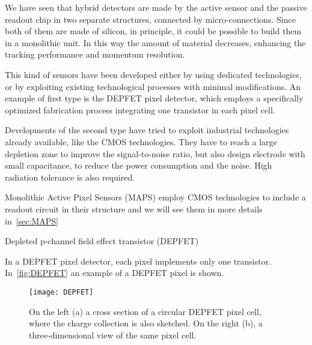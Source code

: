 We have seen that hybrid detectors are made by the active sensor and the passive readout chip in two separate structures, connected by micro-connections. Since both of them are made of silicon, in principle, it could be possible to build them in a monolithic unit. In this way the amount of material decreases, enhancing the tracking performance and momentum resolution. 

This kind of sensors have been developed either by using dedicated technologies, or by exploiting existing technological processes with minimal modifications. An example of first type is the DEPFET pixel detector, which employs a specifically optimized fabrication process integrating one transistor in each pixel cell.

Developments of the second type have tried to exploit industrial technologies already available, like the CMOS technologies. They have to reach a large depletion zone to improve the signal-to-noise ratio, but also design electrode with small capacitance, to reduce the power consumption and the noise. High radiation tolerance is also required.

Monolithic Active Pixel Sensors (MAPS) employ CMOS technologies to include a readout circuit in their structure and we will see them in more details in~\autoref{sec:MAPS}

\begin{description}
\item[Depleted p-channel field effect transistor (DEPFET)]
\end{description}

In a DEPFET pixel detector, each pixel implements only one transistor. In~\autoref{fig:DEPFET} an example of a DEPFET pixel is shown.

\begin{figure}[h!]
\centering
\texttt{[image: DEPFET]}
\caption{On the left (a) a cross section of a circular DEPFET pixel cell, where the charge collection is also sketched. On the right (b), a three-dimensional view of the same pixel cell.}
\label{fig:DEPFET}
\end{figure}

